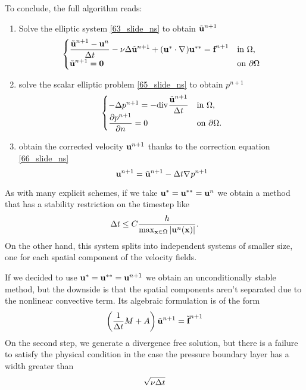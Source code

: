 To conclude, the full algorithm reads: 
\begin{enumerate}
    \item Solve the elliptic system \eqref{63_slide_ns} to obtain \(\tilde{\textbf{u}}^{n+1}\)
    \begin{equation}
        \begin{cases}
            \dfrac{\tilde{\textbf{u}}^{n+1}-\textbf{u}^n}{\Delta t} -\nu\Delta \tilde{\textbf{u}}^{n+1} + (\textbf{u}^* \cdot \nabla\mspace{1mu})\textbf{u}^{**} = \textbf{f}^{n+1} & \text{in }\Omega, \\
            \tilde{\textbf{u}}^{n+1} = \textbf{0} & \text{on }{\partial\Omega}
        \end{cases}
        \label{67_slide_ns}
    \end{equation}
    \item solve the scalar elliptic problem \eqref{65_slide_ns} to obtain \(p^{n+1}\)
    \begin{equation}
        \begin{cases}
            -\Delta p^{n+1} = -\div \dfrac{\tilde{\uvec}^{n+1}}{\tstep} & \txt{in }\Omega, \\
            \displaystyle\partialderivative{p^{n+1}}{n} = 0 & \txt{on }\boundary.
        \end{cases}
        \label{68_slide_ns}
    \end{equation}
    \item obtain the corrected velocity \(\textbf{u}^{n+1}\) thanks to the correction equation \eqref{66_slide_ns}
    \begin{equation}
        \textbf{u}^{n+1} = \tilde{\textbf{u}}^{n+1} - \Delta t \nabla\mspace{1mu} p^{n+1}
        \label{69_slide_ns}
    \end{equation}
\end{enumerate}
As with many explicit schemes, if we take \(\textbf{u}^* = \textbf{u}^{**} = \textbf{u}^n\) we obtain a method that has a stability restriction on the timestep like 
\[
    \Delta t \leq C \frac{h}{\max_{\textbf{x}\in \Omega}\abs{\textbf{u}^n(\textbf{x})}}.
\]
On the other hand, this system splits into independent systems of smaller size, one for each spatial component of the velocity fields.

If we decided to use \(\textbf{u}^* = \textbf{u}^{**} = \textbf{u}^{n+1}\) we obtain an unconditionally stable method, but the downside is that the spatial components aren't separated due to the nonlinear convective term. 
Its algebraic formulation is of the form 
\[
    \left( \frac{1}{\Delta t} M + A \right) \tilde{\textbf{u}}^{n+1} = \tilde{\textbf{f}}^{n+1}
\]
On the second step, we generate a divergence free solution, but there is a failure to satisfy the physical condition in the case the pressure boundary layer has a width greater than 
\[
    \sqrt{\nu \Delta t}
\]